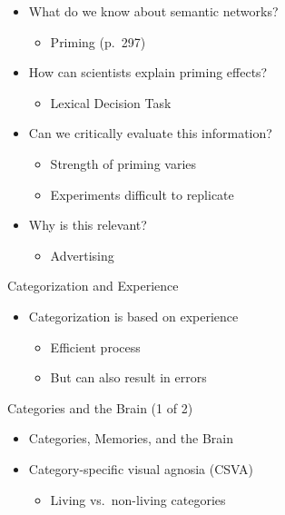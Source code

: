 \documentclass[
]{book}
\providecommand{\tightlist}{%
  \setlength{\itemsep}{0pt}\setlength{\parskip}{0pt}}
\begin{document}
\begin{itemize}
\tightlist
\item
  What do we know about semantic networks?

  \begin{itemize}
  \tightlist
  \item
    Priming (p.~297)\\
  \end{itemize}
\item
  How can scientists explain priming effects?

  \begin{itemize}
  \tightlist
  \item
    Lexical Decision Task\\
  \end{itemize}
\item
  Can we critically evaluate this information?

  \begin{itemize}
  \tightlist
  \item
    Strength of priming varies\\
  \item
    Experiments difficult to replicate\\
  \end{itemize}
\item
  Why is this relevant?

  \begin{itemize}
  \tightlist
  \item
    Advertising
  \end{itemize}
\end{itemize}

Categorization and Experience

\begin{itemize}
\tightlist
\item
  Categorization is based on experience

  \begin{itemize}
  \tightlist
  \item
    Efficient process\\
  \item
    But can also result in errors
  \end{itemize}
\end{itemize}

Categories and the Brain (1 of 2)

\begin{itemize}
\tightlist
\item
  Categories, Memories, and the Brain\\
\item
  Category-specific visual agnosia (CSVA)

  \begin{itemize}
  \tightlist
  \item
    Living vs.~non-living categories
  \end{itemize}
\end{itemize}
\end{document}
